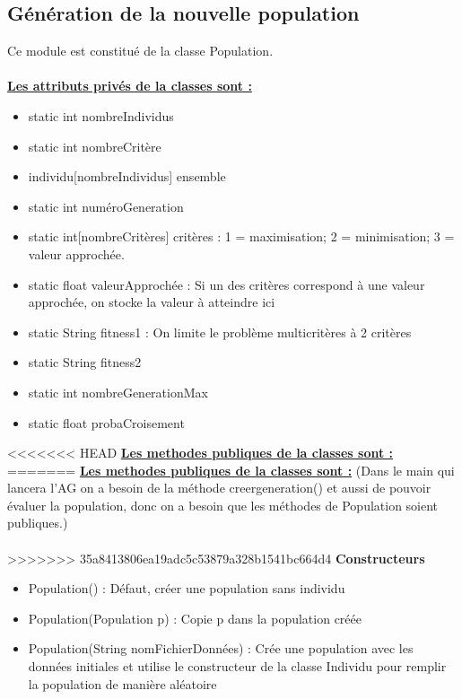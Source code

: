 \documentclass[a4paper,11pt]{article}
\begin{document}
		\subsection{Génération de la nouvelle population}
			Ce module est constitué de la classe Population.\\
			\\
			\underline{\bf Les attributs privés de la classes sont :}\\
				\begin{itemize}
				\item static int nombreIndividus
				\item static int nombreCritère
				\item individu[nombreIndividus] ensemble
				\item static int numéroGeneration
				\item static int[nombreCritères] critères : 1  = maximisation; 2 = minimisation; 3 = valeur approchée.
				\item static float valeurApprochée : Si un des critères correspond à une valeur approchée, on stocke la valeur à atteindre ici
				\item static String fitness1 : On limite le problème multicritères à 2 critères
				\item static String fitness2
				\item static int nombreGenerationMax
				\item static float probaCroisement\\
			\end{itemize}
<<<<<<< HEAD
			\underline{\bf Les methodes publiques de la classes sont :} %
=======
			\underline{\bf Les methodes publiques de la classes sont :} (Dans le main qui lancera l’AG on a besoin de la méthode creergeneration() et aussi de pouvoir évaluer la population, donc on a besoin que les méthodes de Population soient publiques.)\\\\
>>>>>>> 35a8413806ea19adc5c53879a328b1541bc664d4
			\textbf{Constructeurs}
						\begin{itemize}
							\item Population() : Défaut, créer une population sans individu
							\item Population(Population p) : Copie p dans la population créée
							\item Population(String nomFichierDonnées) : Crée une population avec les données initiales et utilise le constructeur de la classe Individu pour remplir la population de manière aléatoire\\
						\end{itemize}
\end{document}
